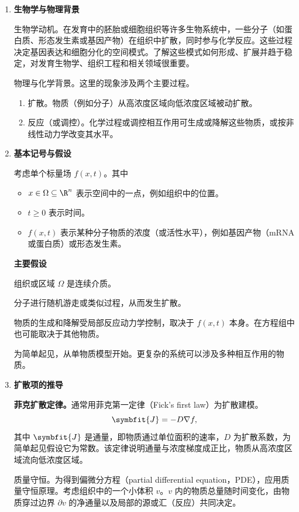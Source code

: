 \begin{enumerate}
  \item \textbf{生物学与物理背景}

  生物学动机。在发育中的胚胎或细胞组织等许多生物系统中，一些分子（如蛋白质、形态发生素或基因产物）在组织中扩散，同时参与化学反应。这些过程决定基因表达和细胞分化的空间模式。了解这些模式如何形成、扩展并趋于稳定，对发育生物学、组织工程和相关领域很重要。

  物理与化学背景。这里的现象涉及两个主要过程。
  \begin{enumerate}[label=\arabic*.]
    \item 扩散。物质（例如分子）从高浓度区域向低浓度区域被动扩散。
    \item 反应（或调控）。化学过程或调控相互作用可生成或降解这些物质，或按非线性动力学改变其水平。
  \end{enumerate}

  \item \textbf{基本记号与假设}

  考虑单个标量场 $f(x,t)$。其中
  \begin{itemize}
    \item $x\in\Omega\subseteq\R^n$ 表示空间中的一点，例如组织中的位置。
    \item $t\geq0$ 表示时间。
    \item $f(x,t)$ 表示某种分子物质的浓度（或活性水平），例如基因产物（mRNA 或蛋白质）或形态发生素。
  \end{itemize}

  \textbf{主要假设}

  组织或区域 $\Omega$ 是连续介质。

  分子进行随机游走或类似过程，从而发生扩散。

  物质的生成和降解受局部反应动力学控制，取决于 $f(x,t)$ 本身。在方程组中也可能取决于其他物质。

  为简单起见，从单物质模型开始。更复杂的系统可以涉及多种相互作用的物质。

  \item \textbf{扩散项的推导}

  \textbf{菲克扩散定律。}通常用菲克第一定律（Fick's first law）为扩散建模。
  \[
    \symbfit{J}=-D\nabla f,
  \]
  其中 $\symbfit{J}$ 是通量，即物质通过单位面积的速率，$D$ 为扩散系数，为简单起见假设它为常数。该定律说明通量与浓度梯度成正比，物质从高浓度区域流向低浓度区域。

  质量守恒。为得到偏微分方程（partial differential equation，PDE），应用质量守恒原理。考虑组织中的一个小体积 $v$。$v$ 内的物质总量随时间变化，由物质穿过边界 $\partial v$ 的净通量以及局部的源或汇（反应）共同决定。


\end{enumerate}
